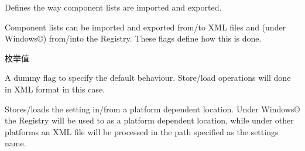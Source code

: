 Defines the way component lists are imported and exported. 

Component lists can be imported and exported from/to X\+M\+L files and (under Windows\copyright{}) from/into the Registry. These flags define how this is done. \begin{Desc}
\item[枚举值]\par
\begin{description}
\item[{\em 
\hypertarget{group___common_interface_gga9390ccf3b2ebe68eee998798d59dc823a5a00a0e3be8a2fa9bc06f8f77840b9e1}{sf\+Default}\label{group___common_interface_gga9390ccf3b2ebe68eee998798d59dc823a5a00a0e3be8a2fa9bc06f8f77840b9e1}
}]A dummy flag to specify the default behaviour. Store/load operations will done in X\+M\+L format in this case. \item[{\em 
\hypertarget{group___common_interface_gga9390ccf3b2ebe68eee998798d59dc823a7558412f9b613d098c692dbd1dab68b2}{sf\+Native}\label{group___common_interface_gga9390ccf3b2ebe68eee998798d59dc823a7558412f9b613d098c692dbd1dab68b2}
}]Stores/loads the setting in/from a platform dependent location. Under Windows\copyright{} the Registry will be used to as a platform dependent location, while under other platforms an X\+M\+L file will be processed in the path specified as the settings name.


\end{description}
\end{Desc}
